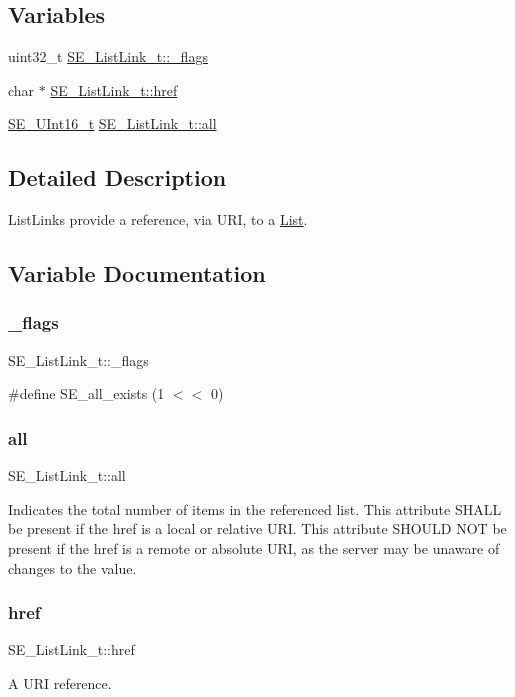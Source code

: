 \subsection*{Variables}
\begin{DoxyCompactItemize}
\item 
uint32\+\_\+t \hyperlink{group__ListLink_gad8a3a58e8432327078b8557e81ae92a6}{S\+E\+\_\+\+List\+Link\+\_\+t\+::\+\_\+flags}
\item 
char $\ast$ \hyperlink{group__ListLink_gabee3c5cf373e1b81ded1da5f5c96ee0b}{S\+E\+\_\+\+List\+Link\+\_\+t\+::href}
\item 
\hyperlink{group__UInt16_gac68d541f189538bfd30cfaa712d20d29}{S\+E\+\_\+\+U\+Int16\+\_\+t} \hyperlink{group__ListLink_ga7ec03b4bdba43fa2b504df453964acb5}{S\+E\+\_\+\+List\+Link\+\_\+t\+::all}
\end{DoxyCompactItemize}


\subsection{Detailed Description}
List\+Links provide a reference, via U\+RI, to a \hyperlink{structList}{List}. 

\subsection{Variable Documentation}
\mbox{\label{group__ListLink_gad8a3a58e8432327078b8557e81ae92a6}} 
\subsubsection{\texorpdfstring{\+\_\+flags}{\_flags}}
{\footnotesize\ttfamily S\+E\+\_\+\+List\+Link\+\_\+t\+::\+\_\+flags}

\#define S\+E\+\_\+all\+\_\+exists (1 $<$$<$ 0) \mbox{\label{group__ListLink_ga7ec03b4bdba43fa2b504df453964acb5}} 
\subsubsection{\texorpdfstring{all}{all}}
{\footnotesize\ttfamily S\+E\+\_\+\+List\+Link\+\_\+t\+::all}

Indicates the total number of items in the referenced list. This attribute S\+H\+A\+LL be present if the href is a local or relative U\+RI. This attribute S\+H\+O\+U\+LD N\+OT be present if the href is a remote or absolute U\+RI, as the server may be unaware of changes to the value. \mbox{\label{group__ListLink_gabee3c5cf373e1b81ded1da5f5c96ee0b}} 
\subsubsection{\texorpdfstring{href}{href}}
{\footnotesize\ttfamily S\+E\+\_\+\+List\+Link\+\_\+t\+::href}

A U\+RI reference. 